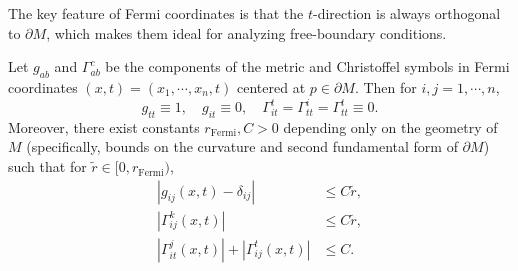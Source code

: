 The key feature of Fermi coordinates is that the $t$-direction is always orthogonal to $\partial M$,
which makes them ideal for analyzing free-boundary conditions.

\begin{lemma}\label{lem:fermi-metric}
Let $g_{ab}$ and $\Gamma_{ab}^c$ be the components of the metric and Christoffel symbols in Fermi
coordinates $(x,t)=(x_1,\cdots,x_n,t)$ centered at $p \in \partial M$. Then for $i,j=1,\cdots,n$,
\begin{equation}\label{eq:fermi-metric-properties}
g_{tt} \equiv 1, \quad g_{it} \equiv 0, \quad \Gamma_{it}^t=\Gamma_{tt}^i=\Gamma_{tt}^t \equiv 0.
\end{equation}
Moreover, there exist constants $r_{\mathrm{Fermi}},C>0$ depending only on the geometry of $M$
(specifically, bounds on the curvature and second fundamental form of $\partial M$) such that for
$\tilde r \in [0,r_{\mathrm{Fermi}})$,
\begin{equation}\label{eq:fermi-estimates}
\begin{split}
|g_{ij}(x,t)-\delta_{ij}| &\leq C \tilde r, \\
|\Gamma_{ij}^k(x,t)| &\leq C \tilde r, \\
|\Gamma_{it}^j(x,t)|+|\Gamma_{ij}^t(x,t)| &\leq C.
\end{split}
\end{equation}
\end{lemma}

